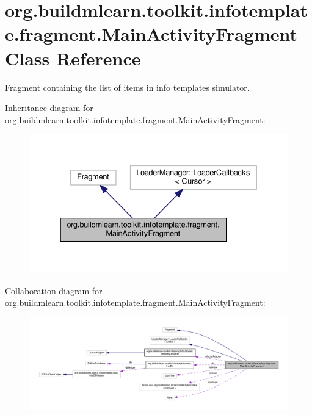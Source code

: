 \hypertarget{classorg_1_1buildmlearn_1_1toolkit_1_1infotemplate_1_1fragment_1_1MainActivityFragment}{}\section{org.\+buildmlearn.\+toolkit.\+infotemplate.\+fragment.\+Main\+Activity\+Fragment Class Reference}
\label{classorg_1_1buildmlearn_1_1toolkit_1_1infotemplate_1_1fragment_1_1MainActivityFragment}


Fragment containing the list of items in info template\textquotesingle{}s simulator.  




Inheritance diagram for org.\+buildmlearn.\+toolkit.\+infotemplate.\+fragment.\+Main\+Activity\+Fragment\+:
\nopagebreak
\begin{figure}[H]
\begin{center}
\leavevmode
\includegraphics[width=331pt]{classorg_1_1buildmlearn_1_1toolkit_1_1infotemplate_1_1fragment_1_1MainActivityFragment__inherit__graph}
\end{center}
\end{figure}


Collaboration diagram for org.\+buildmlearn.\+toolkit.\+infotemplate.\+fragment.\+Main\+Activity\+Fragment\+:
\nopagebreak
\begin{figure}[H]
\begin{center}
\leavevmode
\includegraphics[width=350pt]{classorg_1_1buildmlearn_1_1toolkit_1_1infotemplate_1_1fragment_1_1MainActivityFragment__coll__graph}
\end{center}
\end{figure}
